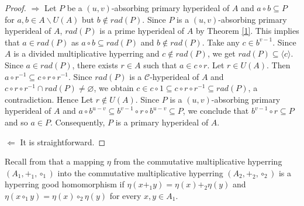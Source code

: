 \documentclass[preprint,review,10pt]{amsart}
\theoremstyle{definition}
\theoremstyle{remark}
\numberwithin{equation}{section}
\begin{document}
\begin{proof}
$\Longrightarrow $ Let $P$ be a $(u,v)$-absorbing primary hyperideal of $A$ and $a \circ b \subseteq P$ for $a,b \in A \backslash U(A)$ but $ b\notin rad(P)$. Since $P$ is a $(u,v)$-absorbing primary hyperideal of $A$, $rad(P)$ is a prime hyperideal of $A$ by Theorem \ref{1}. This implies that $a \in rad(P)$ as $a \circ b \subseteq rad(P)$ and $b \notin rad(P)$. Take any $c \in b^{v-1}$. Since $A$ is  a divided multiplicative hyperring and $c \notin rad(P)$, we get $rad(P) \subseteq \langle c \rangle$. Since $a \in rad(P)$, there exists $r \in A$ such that $a \in c \circ r$. Let $r \in U(A)$. Then $a \circ r^{-1} \subseteq  c \circ r \circ r^{-1}$. Since $rad(P)$ is a $\mathcal{C}$-hyperideal of $A$ and $ c \circ r \circ r^{-1} \cap rad(P) \neq \varnothing$, we obtain $c \in c \circ 1 \subseteq c \circ r \circ r^{-1} \subseteq rad(P)$, a contradiction. Hence Let $r \notin U(A)$. Since $P$ is a $(u,v)$-absorbing primary hyperideal of $A$ and $a \circ b ^{u-v} \subseteq b^{v-1} \circ r \circ b^{u-v} \subseteq P$, we conclude that $b^{v-1} \circ r \subseteq P$ and so $a \in P$. Consequently, $P$ is a primary hyperideal of $A$.

$\Longleftarrow$ It is straightforward. 
\end{proof}
Recall from \cite{f10} that a mapping $\eta$ from the commutative multiplicative hyperring
$(A_1, +_1, \circ _1)$ into the commutative multiplicative hyperring $(A_2, +_2, \circ _2)$ is a hyperring good homomorphism if $\eta(x +_1 y) =\eta(x)+_2 \eta(y)$ and $\eta(x\circ_1y) = \eta(x)\circ_2 \eta(y)$ for every $x,y \in A_1$.
\end{document}
